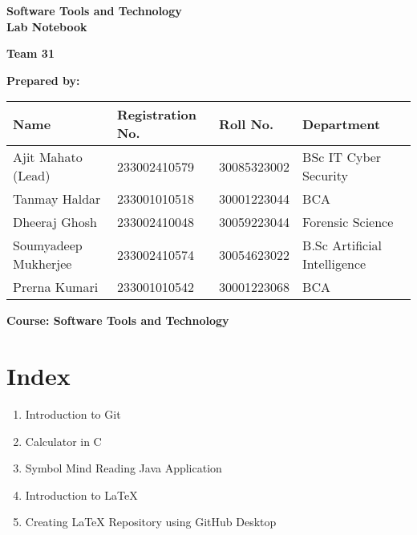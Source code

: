 
\begin{titlepage}
    \centering
    \vspace*{2cm}
    
    {\Huge\bfseries Software Tools and Technology \\[0.4cm] Lab Notebook \\[2cm]}
    
    {\Large\textbf{Team 31}\\[1.5cm]}
    
    \vspace{0.5cm}
    \textbf{Prepared by:}\\[0.5cm]
    
    \vspace{1cm}
    \begin{tabular}{|l|l|l|l|}
    \hline
    \textbf{Name} & \textbf{Registration No.} & \textbf{Roll No.} & \textbf{Department} \\
    \hline
     Ajit Mahato (Lead)& 233002410579& 30085323002& BSc IT Cyber Security\\
    Tanmay Haldar &233001010518 & 30001223044 & BCA \\
    Dheeraj Ghosh & 233002410048 & 30059223044 & Forensic Science  \\
    Soumyadeep Mukherjee & 233002410574 & 30054623022 & B.Sc Artificial Intelligence \\
    Prerna Kumari &233001010542 &30001223068 &BCA \\
    \hline
    \end{tabular}
    
    \vspace{2cm}
    
    \vfill
    \textbf{Course: Software Tools and Technology}
    
\end{titlepage}

\newpage
\chapter*{Index}
\thispagestyle{empty}

\begin{enumerate}
    \item Introduction to Git
    \item Calculator in C
    \item Symbol Mind Reading Java Application
    \item Introduction to LaTeX
    \item Creating LaTeX Repository using GitHub Desktop
\end{enumerate}

